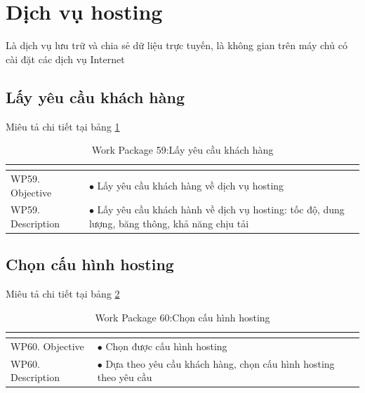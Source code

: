 \documentclass[a4paper]{book}
\begin{document}
\section{Dịch vụ hosting} Là dịch vụ lưu trữ và chia sẻ dữ liệu trực tuyến, là không gian trên máy chủ có cài đặt các dịch vụ Internet
\subsection{Lấy yêu cầu khách hàng} Miêu tả chi tiết tại bảng \ref{table:layyeucaukhachhang}
\begin{table}[h!]
	\begin{center}
		\begin{tabular}{|p{4cm}|p{10cm}|}
			\hline
			\multicolumn{2}{|c|}{\cellcolor[HTML]{363636}{\color[HTML]{FFFFFF}Work package 59: Lấy yêu cầu khách hàng}}\\
			\hline
			\multirow{1}{*}{WP59. Objective} & $\bullet$ Lấy yêu cầu khách hàng về dịch vụ hosting\\
			\hline
			\multirow{1}{*}{WP59. Description} & $\bullet$ Lấy yêu cầu khách hành về dịch vụ hosting: tốc độ, dung lượng, băng thông, khả năng chịu tải\\
			\hline
		\end{tabular}
		\caption{Work Package 59:Lấy yêu cầu khách hàng}
		\label{table:layyeucaukhachhang}
	\end{center}
\end{table}
\subsection{Chọn cấu hình hosting} Miêu tả chi tiết tại bảng \ref{table:choncauhinhhosting}
\begin{table}[h!]
	\begin{center}
		\begin{tabular}{|p{4cm}|p{10cm}|}
			\hline
			\multicolumn{2}{|c|}{\cellcolor[HTML]{363636}{\color[HTML]{FFFFFF}Work package 60: Chọn cấu hình hosting}}\\
			\hline
			\multirow{1}{*}{WP60. Objective} & $\bullet$ Chọn được cấu hình hosting\\
			\hline
			\multirow{1}{*}{WP60. Description} & $\bullet$ Dựa theo yêu cầu khách hàng, chọn cấu hình hosting theo yêu cầu\\
			\hline
		\end{tabular}
		\caption{Work Package 60:Chọn cấu hình hosting}
		\label{table:choncauhinhhosting}
	\end{center}
\end{table}
\end{document}
